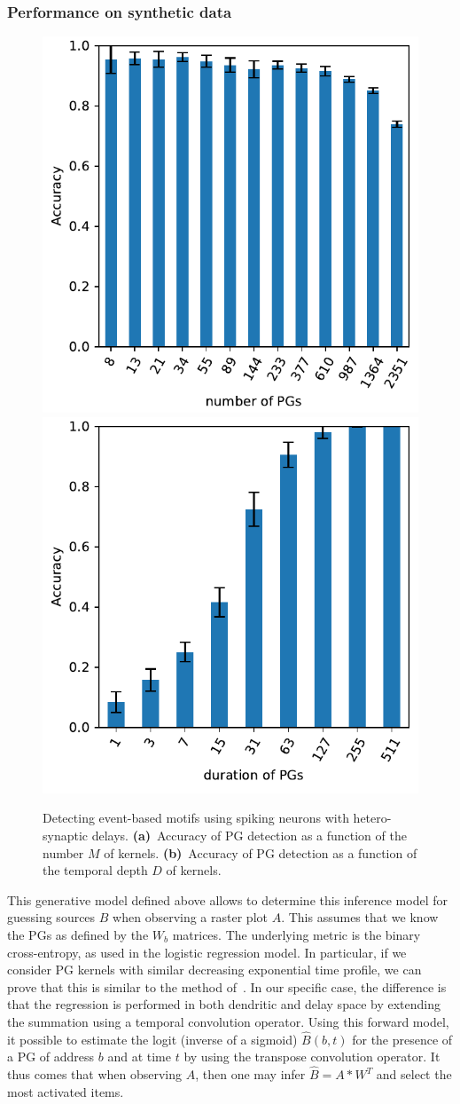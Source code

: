 \documentclass[default]{sn-jnl}%
\theoremstyle{thmstyleone}%
\theoremstyle{thmstyletwo}%
\theoremstyle{thmstylethree}%
\begin{document}
\subsubsection{Performance on synthetic data}
%
\begin{figure}[t!]
    \centering
    \includegraphics[width=0.490\linewidth]{figures/figure_N_PGs.pdf}
    \includegraphics[width=0.490\linewidth]{figures/figure_N_PG_time.pdf}
	    \caption{Detecting event-based motifs using spiking neurons with hetero-synaptic delays. 
	    {\bf (a)}~Accuracy of PG detection as a function of the number $M$ of kernels.
	    {\bf (b)}~Accuracy of PG detection as a function of the temporal depth $D$ of kernels.
	    	     }
    \label{fig:model_results}
\end{figure}
% 
This generative model defined above allows to determine this inference model for guessing sources $B$ when observing a raster plot $A$. This assumes that we know the PGs as defined by the $W_b$ matrices. The underlying metric is the binary cross-entropy, as used in the logistic regression model. In particular, if we consider PG kernels with similar decreasing exponential time profile, we can prove that this is similar to the method of~\citet{berens_fast_2012}. In our specific case, the difference is that the regression is performed in both dendritic and delay space by extending the summation using a temporal convolution operator. Using this forward model, it possible to estimate the logit (inverse of a sigmoid) $\hat{B}(b, t)$ for the presence of a PG of address $b$ and at time $t$ by using the transpose convolution operator. It thus comes that when observing $A$, then one may infer $\hat{B} = A \ast W^T$ and select the most activated items. 
\end{document}
